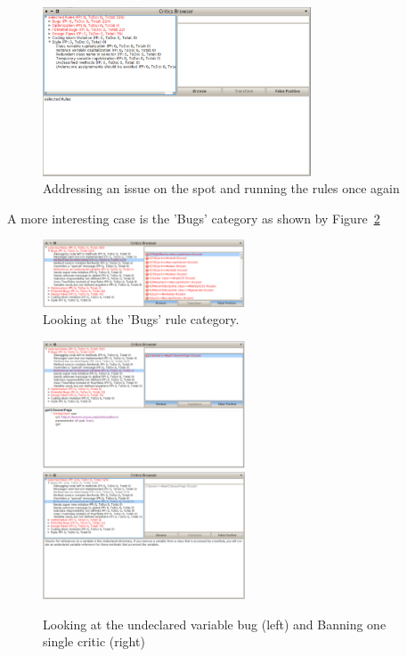\documentclass[a4paper,10pt,twoside]{book}
\begin{document}
\begin{figure}[h]
\centering
\includegraphics[width=8cm]{ReapplyingTheRulesAfterAChange}
\caption{Addressing an issue on the spot and running the rules once again\label{reapplying}}
\end{figure}





A more interesting case is the 'Bugs' category as shown by Figure~\ref{LookingAtBugs}
\begin{figure}[h]
\centering
\includegraphics[width=6cm]{LookingAtBugs}
\caption{Looking at the 'Bugs' rule category.\label{LookingAtBugs}}
\end{figure}


\begin{figure}[h]
\centering
\includegraphics[width=6cm]{OneUndeclaredRefence}\includegraphics[width=6cm]{BanningOneViolation}
\caption{Looking at the undeclared variable bug (left) and Banning one single critic (right)\label{BanningOneViolation}}
\end{figure}
\end{document}
